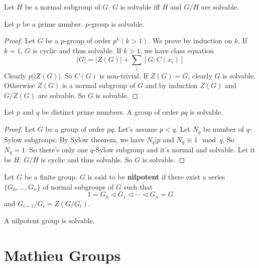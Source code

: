 \documentclass[12pt]{book}
\begin{document}
	\begin{theorem}
		Let $H$ be a normal subgroup of $G$. $G$ is solvable iff $H$ and $G/H$ are solvable.
	\end{theorem}
	
	\begin{theorem}
		Let $p$ be a prime number. $p$-group is solvable.
	\end{theorem}
	
	\begin{proof}
		Let $G$ be a $p$-group of order $p^k(k>1)$. We prove by induction on $k$. If $k=1$, $G$ is cyclic and thus solvable. If $k>1$, we have class equation
		\begin{equation}
			|G|=|Z(G)|+\sum_i[G:C(x_i)]
		\end{equation}
		Clearly $p\big||Z(G)|$. So $C(G)$ is non-trivial. If $Z(G)=G$, clearly $G$ is solvable. Otherwise $Z(G)$ is a normal subgroup of $G$ and by induction $Z(G)$ and $G/Z(G)$ are solvable. So $G$ is solvable.
	\end{proof}
	
	\begin{theorem}
		Let $p$ and $q$ be distinct prime numbers. A group of order $pq$ is solvable.
	\end{theorem}
	\begin{proof}
		Let $G$ be a group of order $pq$. Let's assume $p<q$. Let $N_q$ be number of $q$-Sylow subgroups. By Sylow theorem, we have $N_q|p$ and $N_q \equiv 1 \mod q$. So $N_q=1$. So there's only one $q$-Sylow subgroup and it's normal and solvable. Let it be $H$. $G/H$ is cyclic and thus solvable. So $G$ is solvable.
	\end{proof}
	
	\begin{definition}
		Let $G$ be a finite group. $G$ is said to be {\bf nilpotent} if there exist a series $\{G_0,\dots,G_n\}$ of normal subgroups of $G$ such that 
		\begin{equation}
			1=G_0\triangleleft G_1\triangleleft\cdots\triangleleft G_n= G
		\end{equation}
		and $G_{i+1}/G_i=Z(G/G_i)$.  
	\end{definition}
	
	\begin{theorem}
		A nilpotent group is solvable.
	\end{theorem}
	
\chapter{Mathieu Groups}
\end{document}
